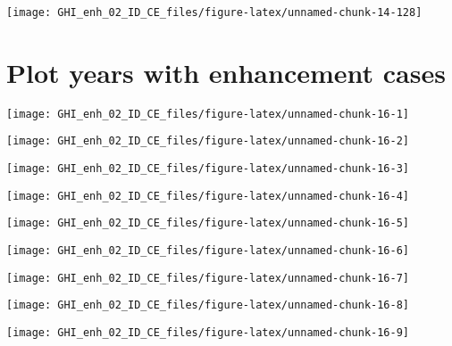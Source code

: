 \documentclass[
  10pt,
  a4paper,oneside]{article}
\begin{document}
\begin{center}\texttt{[image: GHI\_enh\_02\_ID\_CE\_files/figure-latex/unnamed-chunk-14-128]} \end{center}

\newpage
\FloatBarrier

\hypertarget{plot-years-with-enhancement-cases}{%
\section{Plot years with enhancement cases}\label{plot-years-with-enhancement-cases}}

\begin{center}\texttt{[image: GHI\_enh\_02\_ID\_CE\_files/figure-latex/unnamed-chunk-16-1]} \end{center}

\begin{center}\texttt{[image: GHI\_enh\_02\_ID\_CE\_files/figure-latex/unnamed-chunk-16-2]} \end{center}

\begin{center}\texttt{[image: GHI\_enh\_02\_ID\_CE\_files/figure-latex/unnamed-chunk-16-3]} \end{center}

\begin{center}\texttt{[image: GHI\_enh\_02\_ID\_CE\_files/figure-latex/unnamed-chunk-16-4]} \end{center}

\begin{center}\texttt{[image: GHI\_enh\_02\_ID\_CE\_files/figure-latex/unnamed-chunk-16-5]} \end{center}

\begin{center}\texttt{[image: GHI\_enh\_02\_ID\_CE\_files/figure-latex/unnamed-chunk-16-6]} \end{center}

\begin{center}\texttt{[image: GHI\_enh\_02\_ID\_CE\_files/figure-latex/unnamed-chunk-16-7]} \end{center}

\begin{center}\texttt{[image: GHI\_enh\_02\_ID\_CE\_files/figure-latex/unnamed-chunk-16-8]} \end{center}

\begin{center}\texttt{[image: GHI\_enh\_02\_ID\_CE\_files/figure-latex/unnamed-chunk-16-9]} \end{center}
\end{document}

